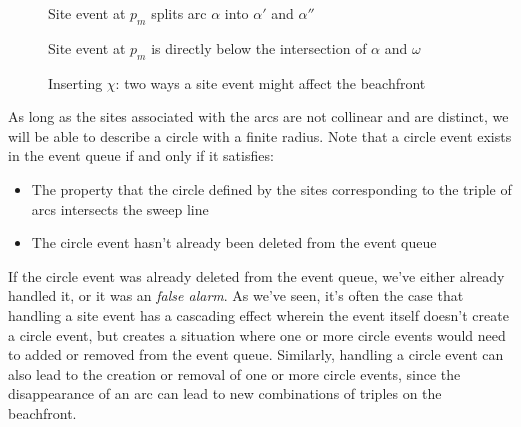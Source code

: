 \documentclass[12pt,twoside]{reedthesis}
\begin{document}
      \begin{figure}[!htb]
        \centering
        \begin{subtable}{0.475\textwidth}
          \centering
          
          \caption{Site event at $p_{m}$ splits arc $\alpha$ into $\alpha'$ and $\alpha''$}
          \label{fig:site_event_cases0}
        \end{subtable}
        \begin{subtable}{0.475\textwidth}
          \centering
          
          \caption{Site event at $p_{m}$ is directly below the intersection of $\alpha$ and $\omega$}
          \label{fig:site_event_cases1}
        \end{subtable}
        \caption{Inserting $\chi$: two ways a site event might affect the beachfront}
        \label{fig:site_event_cases}
      \end{figure}


      As long as the sites associated with the arcs are not collinear and are distinct, we will be able to describe a circle with a finite radius. Note that a circle event exists in the event queue if and only if it satisfies:
      \begin{itemize}
      \setlength\itemsep{.5em}
      \item The property that the circle defined by the sites corresponding to the triple of arcs intersects the sweep line
      \item The circle event hasn't already been deleted from the event queue
      \end{itemize}\par
      If the circle event was already deleted from the event queue, we've either already handled it, or it was an \emph{false alarm}. As we've seen, it's often the case that handling a site event has a cascading effect wherein the event itself doesn't create a circle event, but creates a situation where one or more circle events would need to added or removed from the event queue. Similarly, handling a circle event can also lead to the creation or removal of one or more circle events, since the disappearance of an arc can lead to new combinations of triples on the beachfront.\par
\end{document}
